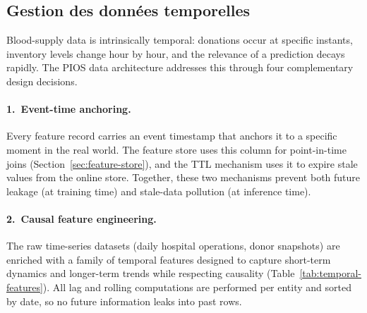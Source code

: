 
\subsection{Gestion des données temporelles}
\label{sec:temporal-management}

Blood-supply data is intrinsically temporal: donations occur at specific
instants, inventory levels change hour by hour, and the relevance of a
prediction decays rapidly.  The PIOS data architecture addresses this
through four complementary design decisions.

\paragraph{1.\ Event-time anchoring.}

Every feature record carries an event timestamp that anchors it to a
specific moment in the real world.  The feature store uses this column for
point-in-time joins (Section~\ref{sec:feature-store}), and the TTL
mechanism uses it to expire stale values from the online store.  Together,
these two mechanisms prevent both future leakage (at training time) and
stale-data pollution (at inference time).

\paragraph{2.\ Causal feature engineering.}

The raw time-series datasets (daily hospital operations, donor snapshots)
are enriched with a family of temporal features designed to capture
short-term dynamics and longer-term trends while respecting causality
(Table~\ref{tab:temporal-features}).  All lag and rolling computations are
performed per entity and sorted by date, so no future information leaks
into past rows.

